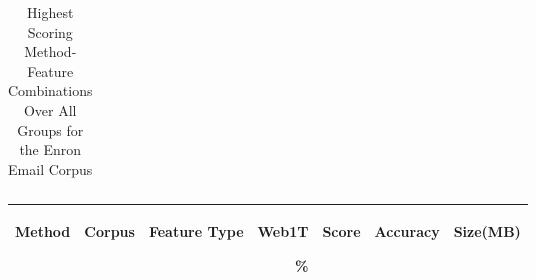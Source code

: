 \begin{table}[htbp!]
\begin{center}
\begin{tabular}{ | r | r | r | r | r | r | r | }
		\end{tabular}
		\caption{Highest Scoring Method-Feature Combinations Over All Groups for the Enron Email Corpus}
		\label{tab:top_enron_by_score_all_groups}
	\end{center}
\end{table}

\begin{table}[htbp!]
	\begin{center}
		\begin{tabular}{ | r | r | r | r | r | r | r | }
			\hline
			\begin{sideways}Method\end{sideways} & \begin{sideways}Corpus\end{sideways} & \begin{sideways}Feature Type\end{sideways} & \begin{sideways}Web1T\end{sideways} \% & \begin{sideways}Score\end{sideways} & \begin{sideways}Accuracy\end{sideways} & \begin{sideways}Size(MB)\end{sideways}\\ \hline 
			

\end{tabular}
\end{center}
\end{table}
